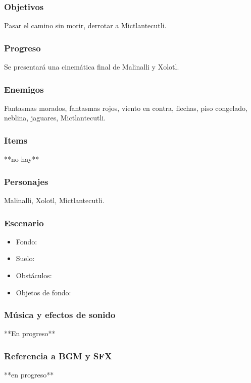 \documentclass[11pt,letterpaper]{article}
\begin{document}
	\subsubsection{Objetivos}
	Pasar el camino sin morir, derrotar a Mictlantecutli.
	\subsubsection{Progreso}
	Se presentará una cinemática final de Malinalli y Xolotl.
	\subsubsection{Enemigos}
	Fantasmas morados, fantasmas rojos, viento en contra, flechas, piso congelado, neblina, jaguares, Mictlantecutli.
	\subsubsection{Items}
	**no hay**
	\subsubsection{Personajes}
	Malinalli, Xolotl, Mictlantecutli.
	\subsubsection{Escenario}
\begin{itemize} 
	\item Fondo:
	\item Suelo:
	\item Obstáculos:
	\item Objetos de fondo:
\end{itemize}	
	\subsubsection{Música y efectos de sonido}
	**En progreso**
	\subsubsection{Referencia a BGM y SFX}
	**en progreso**
\end{document}
